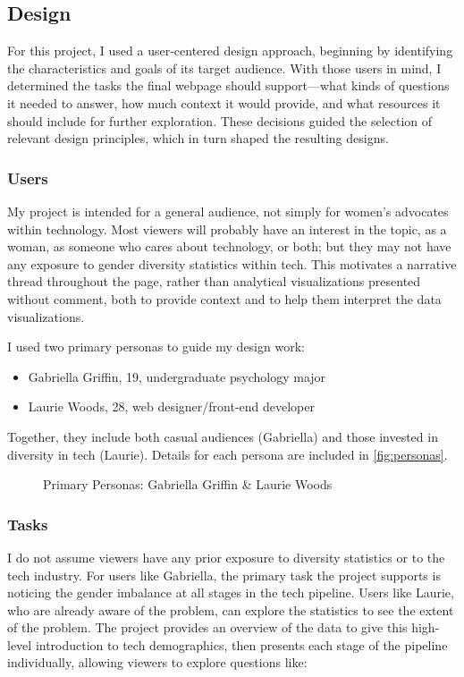 \subsection{Design}\label{sec:design}
For this project, I used a user-centered design approach, beginning by identifying the characteristics and goals of its target audience. With those users in mind, I determined the tasks the final webpage should support---what kinds of questions it needed to answer, how much context it would provide, and what resources it should include for further exploration. These decisions guided the selection of relevant design principles, which in turn shaped the resulting designs.

\subsubsection{Users}\label{users}
My project is intended for a general audience, not simply for women's advocates within technology. Most viewers will probably have an interest in the topic, as a woman, as someone who cares about technology, or both; but they may not have any exposure to gender diversity statistics within tech. This motivates a narrative thread throughout the page, rather than analytical visualizations presented without comment, both to provide context and to help them interpret the data visualizations.

I used two primary personas to guide my design work:
\begin{itemize}
  \item Gabriella Griffin, 19, undergraduate psychology major
  \item Laurie Woods, 28, web designer/front-end developer
\end{itemize}
Together, they include both casual audiences (Gabriella) and those invested in diversity in tech (Laurie). Details for each persona are included in \autoref{fig:personas}.

\begin{figure}
  \caption{Primary Personas: Gabriella Griffin \& Laurie Woods}\label{fig:personas}
\end{figure}

\subsubsection{Tasks}\label{tasks}
I do not assume viewers have any prior exposure to diversity statistics or to the tech industry. For users like Gabriella, the primary task the project supports is noticing the gender imbalance at all stages in the tech pipeline. Users like Laurie, who are already aware of the problem, can explore the statistics to see the extent of the problem. The project provides an overview of the data to give this high-level introduction to tech demographics, then presents each stage of the pipeline individually, allowing viewers to explore questions like:

